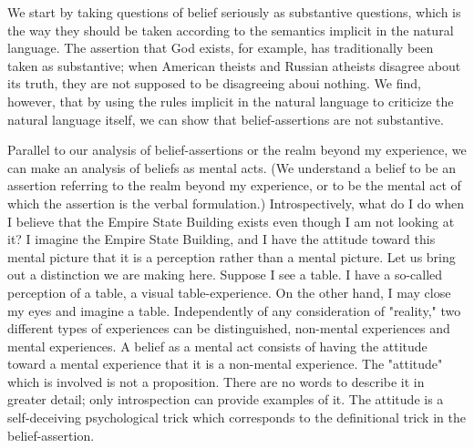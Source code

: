 \documentclass[10pt,twoside,draft]{memoir}
\begin{document}
We start by taking questions of belief seriously as substantive questions, 
which is the way they should be taken according to the semantics implicit in 
the natural language. The assertion that God exists, for example, has 
traditionally been taken as substantive; when American theists and Russian 
atheists disagree about its truth, they are not supposed to be disagreeing 
aboui nothing. We find, however, that by using the rules implicit in the 
natural language to criticize the natural language itself, we can show that 
belief-assertions are not substantive. 

Parallel to our analysis of belief-assertions or the realm beyond my 
experience, we can make an analysis of beliefs as mental acts. (We 
understand a belief to be an assertion referring to the realm beyond my 
experience, or to be the mental act of which the assertion is the verbal 
formulation.) Introspectively, what do I do when I believe that the Empire 
State Building exists even though I am not looking at it? I imagine the 
Empire State Building, and I have the attitude toward this mental picture 
that it is a perception rather than a mental picture. Let us bring out a 
distinction we are making here. Suppose I see a table. I have a so-called 
perception of a table, a visual table-experience. On the other hand, I may 
close my eyes and imagine a table. Independently of any consideration of 
"reality," two different types of experiences can be distinguished, 
non-mental experiences and mental experiences. A belief as a mental act 
consists of having the attitude toward a mental experience that it is a 
non-mental experience. The "attitude" which is involved is not a 
proposition. There are no words to describe it in greater detail; only 
introspection can provide examples of it. The attitude is a self-deceiving 
psychological trick which corresponds to the definitional trick in the 
belief-assertion. 
\end{document}
